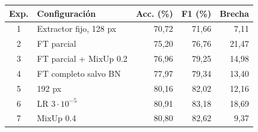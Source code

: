 \begin{tabular}{@{}clrrr@{}}
\toprule
\textbf{Exp.} & \textbf{Configuración} & \textbf{Acc. (\%)} & \textbf{F1 (\%)} & \textbf{Brecha} \\
\midrule
1 & Extractor fijo, 128 px & 70,72 & 71,66 & 7,11 \\
2 & FT parcial & 75,20 & 76,76 & 21,47 \\
3 & FT parcial + MixUp 0.2 & 76,96 & 79,25 & 14,98 \\
4 & FT completo salvo BN & 77,97 & 79,34 & 13,40 \\
5 & 192 px & 80,16 & 82,02 & 12,16 \\
6 & LR $3\cdot10^{-5}$ & 80,91 & 83,18 & 18,69 \\
7 & MixUp 0.4 & 80,80 & 82,62 & 9,37 \\
\bottomrule
\end{tabular}
